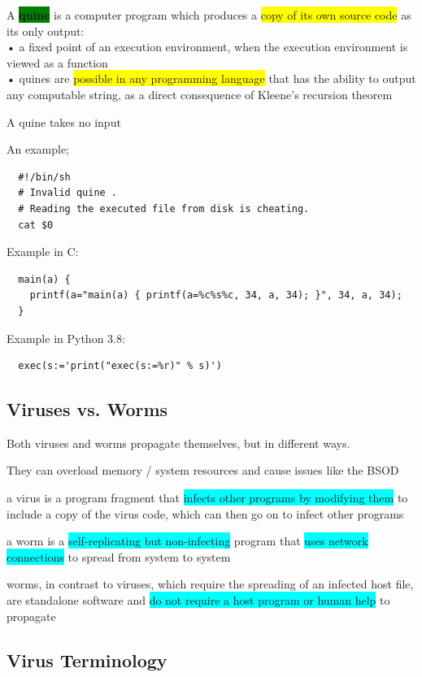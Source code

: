 \documentclass[]{project_plan}
\begin{document}
A \colorbox{green}{\textbf{quine}} is a computer program which produces a \colorbox{yellow}{copy of its own source code} as its only
output:\\
• a fixed point of an execution environment, when the execution environment is viewed as a
function\\
• quines are \colorbox{yellow}{possible in any programming language} that has the ability to output any computable string,
as a direct consequence of Kleene’s recursion theorem

A quine takes no input

An example;
\begin{lstlisting}
  #!/bin/sh
  # Invalid quine .
  # Reading the executed file from disk is cheating.
  cat $0
\end{lstlisting}

Example in C:
\begin{lstlisting}
  main(a) {
    printf(a="main(a) { printf(a=%c%s%c, 34, a, 34); }", 34, a, 34);
  }
\end{lstlisting}

Example in Python 3.8:
\begin{lstlisting}
  exec(s:='print("exec(s:=%r)" % s)')
\end{lstlisting}

\subsection{Viruses vs. Worms}

Both viruses and worms propagate themselves, but in different ways.

They can overload memory / system resources and cause issues like the BSOD

a virus is a program fragment that \colorbox{cyan}{infects other programs by modifying them} to include a
copy of the virus code, which can then go on to infect other programs

a worm is a \colorbox{cyan}{self-replicating but non-infecting} program that \colorbox{cyan}{uses network
  connections} to spread from system to system

worms, in contrast to viruses, which require the spreading of an infected host file, are
standalone software and \colorbox{cyan}{do not require a host program or human help} to propagate

\subsection{Virus Terminology}
\end{document}
